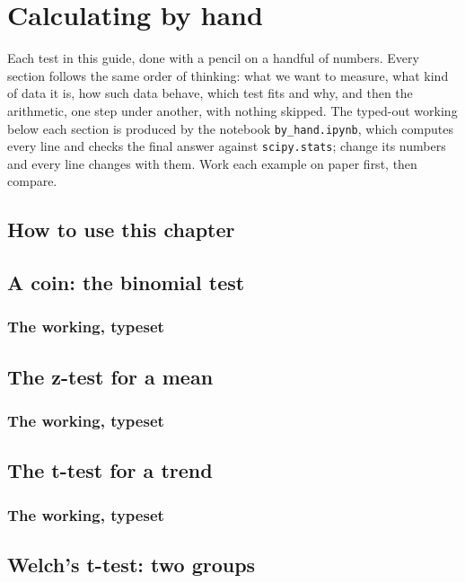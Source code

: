\chapter{Calculating by hand}\label{ch:byhand}

Each test in this guide, done with a pencil on a handful of numbers. Every section follows the same order of thinking: what we want to measure, what kind of data it is, how such data behave, which test fits and why, and then the arithmetic, one step under another, with nothing skipped. The typed-out working below each section is produced by the notebook \texttt{by\_hand.ipynb}, which computes every line and checks the final answer against \texttt{scipy.stats}; change its numbers and every line changes with them. Work each example on paper first, then compare.

\section{How to use this chapter}


\section{A coin: the binomial test}

\subsection*{The working, typeset}


\section{The z-test for a mean}

\subsection*{The working, typeset}


\section{The t-test for a trend}

\subsection*{The working, typeset}


\section{Welch's t-test: two groups}

